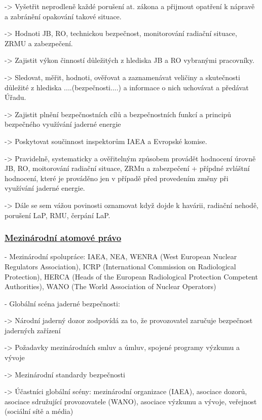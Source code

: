 \begin{itemize}
        -> Vyšetřit neprodleně každé porušení at. zákona a přijmout opatření k nápravě a zabránění opakování takové situace.

        -> Hodnoti JB, RO, technickou bezpečnost, monitorování radiační situace, ZRMU a zabezpečení.

        -> Zajistit výkon činností důležitých z hlediska JB a RO vybranými pracovníky.

        -> Sledovat, měřit, hodnoti, ověřovat a zaznamenávat veličiny a skutečnosti důležité z hlediska ....(bezpečnosti....) a informace o nich uchovávat a předávat Úřadu.

        -> Zajistit plnění bezpečnostních cílů a bezpečnostních funkcí a principů bezpečného využívání jaderné energie

        -> Poskytovat součinnost inspektorům IAEA a Evropské komise.

        -> Pravidelně, systematicky a ověřitelným způsobem provádět hodnocení úrovně JB, RO, moitorování radiační situace, ZRMu a zabezpečení + přípdné zvláštní hodnocení, které je prováděno jen v případě před provedením změny při využívání jaderné energie.

        -> Dále se sem vážou povinosti oznamovat když dojde k havárii, radiační nehodě, porušení LaP, RMU, čerpání LaP.

        
\end{itemize}



\subsubsection{\underline{Mezinárodní atomové právo}}

\noindent\noindent - 	Mezinárodní spolupráce: IAEA, NEA, WENRA (West European Nuclear Regulators Association), ICRP (International Commission on Radiological Protection), HERCA (Heads of the European Radiological Protection Competent Authorities), WANO (The World Association of Nuclear Operators)

\noindent\noindent - 	Globální scéna jaderné bezpečnosti:

->	Národní jaderný dozor zodpovídá za to, že provozovatel zaručuje bezpečnost jaderných zařízení

->	Požadavky mezinárodních smluv a úmluv, spojené programy výzkumu a vývoje

->	Mezinárodní standardy bezpečnosti

->	Účastníci globální scény: mezinárodní organizace (IAEA), asociace dozorů, asociace sdružující provozovatele (WANO), asociace výzkumu a vývoje, veřejnost (sociální sítě a média)

